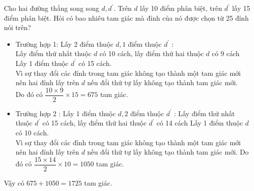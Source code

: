 
\begin{bt}%
	Cho hai đường thẳng song song $d, d^{\prime}$. Trên $d$ lấy 10 điểm phân biệt, trên $d^{\prime}$ lấy 15 điểm phân biệt. Hỏi có bao nhiêu tam giác mà đỉnh của nó được chọn từ 25 đỉnh nói trên?
	\loigiai
	{
		\begin{itemize}	
			\item Trường hợp 1: Lấy 2 điểm thuộc $d, 1$ điểm thuộc $d^{\prime}$ :\\
			Lấy điểm thứ nhất thuộc $d$ có 10 cách, lấy điểm thứ hai thuộc $d$ có 9 cách
			Lấy 1 điểm thuộc $d^{\prime}$ có 15 cách.\\
			Vì sự thay đổi các đỉnh trong tam giác không tạo thành một tam giác mới nên hai đỉnh lấy trên $d$ nếu đổi thứ tự lấy không tạo thành tam giác mới. \\
			Do đó có $\dfrac{10 \times 9}{2} \times 15=675$ tam giác.
			\item Trường hợp 2 : Lấy 1 điểm thuộc $d, 2$ điểm thuộc $d^{\prime}$ :
			Lấy điểm thứ nhất thuộc $d^{\prime}$ có 15 cách, lấy điểm thứ hai thuộc $d^{\prime}$ có 14 cách
			Lấy 1 điểm thuộc $d$ có 10 cách.\\
			Vì sự thay đổi các đỉnh trong tam giác không tạo thành một tam giác mới nên hai đỉnh lấy trên $d$ nếu đổi thứ tự lấy không tạo thành tam giác mới. Do đó có $\dfrac{15 \times 14}{2} \times 10=1050$ tam giác.
		\end{itemize}
		Vậy có $675+1050=1725$ tam giác.}
\end{bt}

